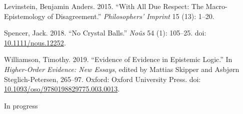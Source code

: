 \documentclass[
  10pt,
  letterpaper,
  DIV=11,
  numbers=noendperiod,
  twoside]{scrartcl}
\newlength{\cslhangindent}
\newenvironment{CSLReferences}[2] %
 {\begin{list}{}{%
  \setlength{\itemindent}{0pt}
  \setlength{\leftmargin}{0pt}
  \setlength{\parsep}{0pt}
  \ifodd #1
   \setlength{\leftmargin}{\cslhangindent}
   \setlength{\itemindent}{-1\cslhangindent}
  \fi
  \setlength{\itemsep}{#2\baselineskip}}}
 {\end{list}}
\begin{document}
\begin{CSLReferences}{1}{0}
Levinstein, Benjamin Anders. 2015. {``With All Due Respect: The
Macro-Epistemology of Disagreement.''} \emph{Philosophers' Imprint} 15
(13): 1--20.

Spencer, Jack. 2018. {``No Crystal Balls.''} \emph{Noûs} 54 (1):
105--25. doi:
\href{https://doi.org/10.1111/nous.12252}{10.1111/nous.12252}.

Williamson, Timothy. 2019. {``Evidence of Evidence in Epistemic
Logic.''} In \emph{Higher-Order Evidence: New Essays}, edited by Mattias
Skipper and Asbjørn Steglich-Petersen, 265--97. Oxford: {O}xford
{U}niversity {P}ress. doi:
\href{https://doi.org/10.1093/oso/9780198829775.003.0013}{10.1093/oso/9780198829775.003.0013}.

\end{CSLReferences}



\noindent \vspace{1in} In progress
\end{document}
